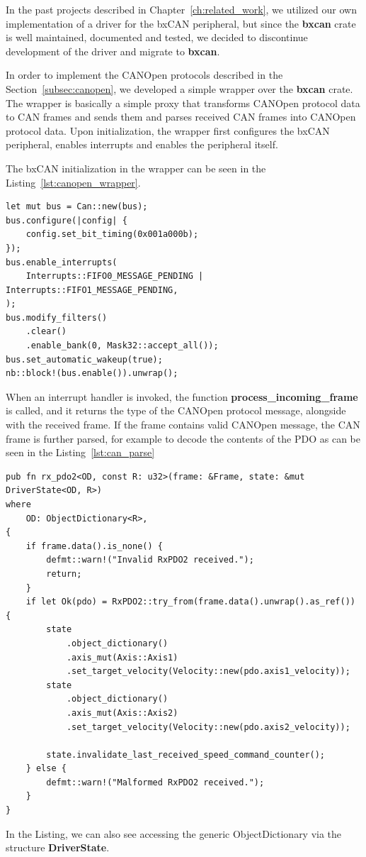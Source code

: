 In the past projects described in Chapter~\ref{ch:related_work}, we utilized our own implementation of a driver for the bxCAN peripheral, but since the \textbf{bxcan} crate is well maintained, documented and tested, we decided to discontinue development of the driver and migrate to \textbf{bxcan}.

In order to implement the CANOpen protocols described in the Section~\ref{subsec:canopen}, we developed a simple wrapper over the \textbf{bxcan} crate.
The wrapper is basically a simple proxy that transforms CANOpen protocol data to CAN frames and sends them and parses received CAN frames into CANOpen protocol data.
Upon initialization, the wrapper first configures the bxCAN peripheral, enables interrupts and enables the peripheral itself.

The bxCAN initialization in the wrapper can be seen in the Listing~\ref{lst:canopen_wrapper}.
\begin{lstlisting}[caption={Initializing the bxCAN peripheral in the CANOpen wrapper.},label=lst:canopen_wrapper]
let mut bus = Can::new(bus);
bus.configure(|config| {
    config.set_bit_timing(0x001a000b);
});
bus.enable_interrupts(
    Interrupts::FIFO0_MESSAGE_PENDING | Interrupts::FIFO1_MESSAGE_PENDING,
);
bus.modify_filters()
    .clear()
    .enable_bank(0, Mask32::accept_all());
bus.set_automatic_wakeup(true);
nb::block!(bus.enable()).unwrap();
\end{lstlisting}

When an interrupt handler is invoked, the function \textbf{process\_incoming\_frame} is called, and it returns the type of the CANOpen protocol message, alongside with the received frame.
If the frame contains valid CANOpen message, the CAN frame is further parsed, for example to decode the contents of the PDO as can be seen in the Listing~\ref{lst:can_parse}

\begin{lstlisting}[caption={Initializing the bxCAN peripheral in the CANOpen wrapper.},label=lst:can_parse]
pub fn rx_pdo2<OD, const R: u32>(frame: &Frame, state: &mut DriverState<OD, R>)
where
    OD: ObjectDictionary<R>,
{
    if frame.data().is_none() {
        defmt::warn!("Invalid RxPDO2 received.");
        return;
    }
    if let Ok(pdo) = RxPDO2::try_from(frame.data().unwrap().as_ref()) {
        state
            .object_dictionary()
            .axis_mut(Axis::Axis1)
            .set_target_velocity(Velocity::new(pdo.axis1_velocity));
        state
            .object_dictionary()
            .axis_mut(Axis::Axis2)
            .set_target_velocity(Velocity::new(pdo.axis2_velocity));

        state.invalidate_last_received_speed_command_counter();
    } else {
        defmt::warn!("Malformed RxPDO2 received.");
    }
}
\end{lstlisting}
In the Listing, we can also see accessing the generic ObjectDictionary via the structure \textbf{DriverState}.

